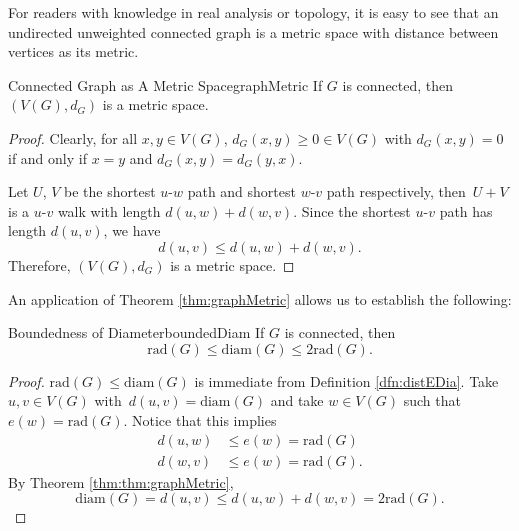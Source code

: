 \documentclass[math, code]{amznotes}
\theoremstyle{remark}
\begin{document}
For readers with knowledge in real analysis or topology, it is easy to see that an undirected unweighted connected graph is a metric space with distance between vertices as its metric. 
\begin{thmbox}{Connected Graph as A Metric Space}{graphMetric}
    If $G$ is connected, then $(V(G), d_G)$ is a metric space.
    \tcblower   
    \begin{proof}
        Clearly, for all $x, y \in V(G)$, $d_G(x, y) \geq 0 \in V(G)$ with $d_G(x, y) = 0$ if and only if $x = y$ and $d_G(x, y) = d_G(y, x)$.

        Let $U$, $V$ be the shortest $u$-$w$ path and shortest $w$-$v$ path respectively, then~$U + V$ is a $u$-$v$ walk with length $d(u, w) + d(w, v)$. Since the shortest $u$-$v$ path has length $d(u, v)$, we have
        \begin{equation*}
            d(u, v) \leq d(u, w) + d(w, v).
        \end{equation*}
        Therefore, $(V(G), d_G)$ is a metric space.
    \end{proof}
\end{thmbox}
An application of Theorem \ref{thm:graphMetric} allows us to establish the following:
\begin{thmbox}{Boundedness of Diameter}{boundedDiam}
    If $G$ is connected, then
    \begin{equation*}
        \mathrm{rad}(G) \leq \mathrm{diam}(G) \leq 2\mathrm{rad}(G).
    \end{equation*}
    \tcblower
    \begin{proof}
        $\mathrm{rad}(G) \leq \mathrm{diam}(G)$ is immediate from Definition \ref{dfn:distEDia}. Take $u, v \in V(G)$ with~$d(u, v) = \mathrm{diam}(G)$ and take $w \in V(G)$ such that $e(w) = \mathrm{rad}(G)$. Notice that this implies
        \begin{align*}
            d(u, w) & \leq e(w) = \mathrm{rad}(G) \\
            d(w, v) & \leq e(w) = \mathrm{rad}(G).
        \end{align*}
        By Theorem \ref{thm:thm:graphMetric}, 
        \begin{equation*}
            \mathrm{diam}(G) = d(u, v) \leq d(u, w) + d(w, v) = 2\mathrm{rad}(G).
        \end{equation*}
    \end{proof}
\end{thmbox}
\end{document}
